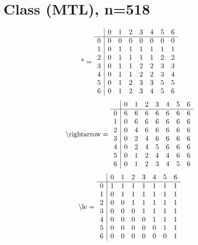 \documentclass[11pt]{article}
\begin{document}
\section{Class (MTL), n=518}
\[\text{*} = 
\begin{array}{r | r r r r r r r}
 & 0 & 1 & 2 & 3 & 4 & 5 & 6 \\ \hline
0 & 0 & 0 & 0 & 0 & 0 & 0 & 0 \\
1 & 0 & 1 & 1 & 1 & 1 & 1 & 1 \\
2 & 0 & 1 & 1 & 1 & 1 & 2 & 2 \\
3 & 0 & 1 & 1 & 2 & 2 & 3 & 3 \\
4 & 0 & 1 & 1 & 2 & 2 & 3 & 4 \\
5 & 0 & 1 & 2 & 3 & 3 & 5 & 5 \\
6 & 0 & 1 & 2 & 3 & 4 & 5 & 6 \\
\end{array}
\]
\[\text{\textbackslash rightarrow} = 
\begin{array}{r | r r r r r r r}
 & 0 & 1 & 2 & 3 & 4 & 5 & 6 \\ \hline
0 & 6 & 6 & 6 & 6 & 6 & 6 & 6 \\
1 & 0 & 6 & 6 & 6 & 6 & 6 & 6 \\
2 & 0 & 4 & 6 & 6 & 6 & 6 & 6 \\
3 & 0 & 2 & 4 & 6 & 6 & 6 & 6 \\
4 & 0 & 2 & 4 & 5 & 6 & 6 & 6 \\
5 & 0 & 1 & 2 & 4 & 4 & 6 & 6 \\
6 & 0 & 1 & 2 & 3 & 4 & 5 & 6 \\
\end{array}
\]
\[\text{\textbackslash le} = 
\begin{array}{r | r r r r r r r}
 & 0 & 1 & 2 & 3 & 4 & 5 & 6 \\ \hline
0 & 1 & 1 & 1 & 1 & 1 & 1 & 1 \\
1 & 0 & 1 & 1 & 1 & 1 & 1 & 1 \\
2 & 0 & 0 & 1 & 1 & 1 & 1 & 1 \\
3 & 0 & 0 & 0 & 1 & 1 & 1 & 1 \\
4 & 0 & 0 & 0 & 0 & 1 & 1 & 1 \\
5 & 0 & 0 & 0 & 0 & 0 & 1 & 1 \\
6 & 0 & 0 & 0 & 0 & 0 & 0 & 1 \\
\end{array}
\]
\end{document}
